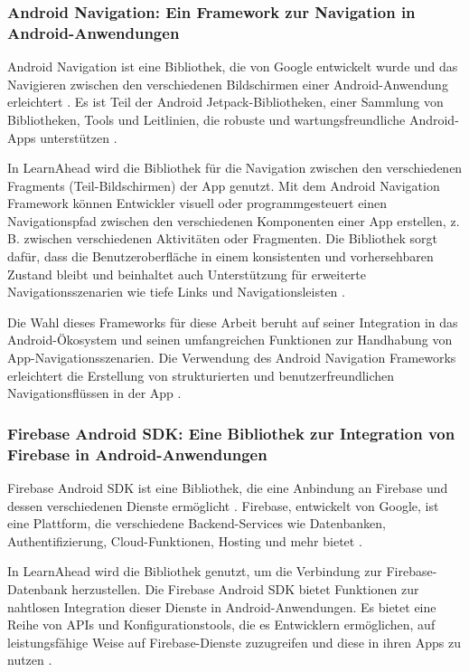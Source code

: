 \subsubsection{Android Navigation: Ein Framework zur Navigation in Android-Anwendungen}
Android Navigation ist eine Bibliothek, die von Google entwickelt wurde und das Navigieren zwischen den verschiedenen Bildschirmen einer Android-Anwendung erleichtert \cite{AndroidNav2022}. Es ist Teil der Android Jetpack-Bibliotheken, einer Sammlung von Bibliotheken, Tools und Leitlinien, die robuste und wartungsfreundliche Android-Apps unterstützen \cite{AndroidJetpack2022}. \newline

\noindent
In LearnAhead wird die Bibliothek für die Navigation zwischen den verschiedenen Fragments (Teil-Bildschirmen) der App genutzt. Mit dem Android Navigation Framework können Entwickler visuell oder programmgesteuert einen Navigationspfad zwischen den verschiedenen Komponenten einer App erstellen, z. B. zwischen verschiedenen Aktivitäten oder Fragmenten. Die Bibliothek sorgt dafür, dass die Benutzeroberfläche in einem konsistenten und vorhersehbaren Zustand bleibt und beinhaltet auch Unterstützung für erweiterte Navigationsszenarien wie tiefe Links und Navigationsleisten \cite{AndroidNav2022}. \newline

\noindent
Die Wahl dieses Frameworks für diese Arbeit beruht auf seiner Integration in das Android-Ökosystem und seinen umfangreichen Funktionen zur Handhabung von App-Navigationsszenarien. Die Verwendung des Android Navigation Frameworks erleichtert die Erstellung von strukturierten und benutzerfreundlichen Navigationsflüssen in der App \cite{AndroidNav2022}.

\subsubsection{Firebase Android SDK: Eine Bibliothek zur Integration von Firebase in Android-Anwendungen}
Firebase Android \ac{SDK} ist eine Bibliothek, die eine Anbindung an Firebase und dessen verschiedenen Dienste ermöglicht \cite{FirebaseSDK2022}. Firebase, entwickelt von Google, ist eine Plattform, die verschiedene Backend-Services wie Datenbanken, Authentifizierung, Cloud-Funktionen, Hosting und mehr bietet \cite{Firebase2022}. \newline

\noindent
In LearnAhead wird die Bibliothek genutzt, um die Verbindung zur Firebase-Datenbank herzustellen. Die Firebase Android SDK bietet Funktionen zur nahtlosen Integration dieser Dienste in Android-Anwendungen. Es bietet eine Reihe von \ac{APIs} und Konfigurationstools, die es Entwicklern ermöglichen, auf leistungsfähige Weise auf Firebase-Dienste zuzugreifen und diese in ihren Apps zu nutzen \cite{FirebaseSDK2022}. \newline

